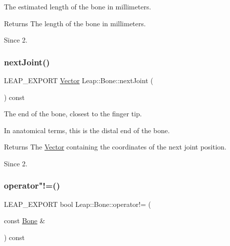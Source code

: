 The estimated length of the bone in millimeters.


\begin{DoxyCodeInclude}
\end{DoxyCodeInclude}


\begin{DoxyReturn}{Returns}
The length of the bone in millimeters. 
\end{DoxyReturn}
\begin{DoxySince}{Since}
2. 
\end{DoxySince}
\mbox{\label{class_leap_1_1_bone_a7122040fb8c15dfa2a99801394e054e1}} 
\subsubsection{\texorpdfstring{next\+Joint()}{nextJoint()}}
{\footnotesize\ttfamily L\+E\+A\+P\+\_\+\+E\+X\+P\+O\+RT \hyperlink{struct_leap_1_1_vector}{Vector} Leap\+::\+Bone\+::next\+Joint (\begin{DoxyParamCaption}{ }\end{DoxyParamCaption}) const}

The end of the bone, closest to the finger tip.

In anatomical terms, this is the distal end of the bone.


\begin{DoxyCodeInclude}
\end{DoxyCodeInclude}


\begin{DoxyReturn}{Returns}
The \hyperlink{struct_leap_1_1_vector}{Vector} containing the coordinates of the next joint position. 
\end{DoxyReturn}
\begin{DoxySince}{Since}
2. 
\end{DoxySince}
\mbox{\label{class_leap_1_1_bone_afd944f35b0d10e17e8a579a38f9ad260}} 
\subsubsection{\texorpdfstring{operator"!=()}{operator!=()}}
{\footnotesize\ttfamily L\+E\+A\+P\+\_\+\+E\+X\+P\+O\+RT bool Leap\+::\+Bone\+::operator!= (\begin{DoxyParamCaption}\item[{const \hyperlink{class_leap_1_1_bone}{Bone} \&}]{ }\end{DoxyParamCaption}) const}


